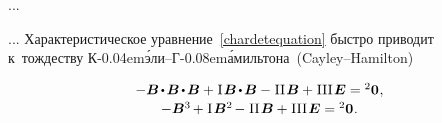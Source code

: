 \begin{otherlanguage}{russian}
...



... Характеристическое уравнение~\eqref{chardetequation} быстро приводит к~тождеству К\kern-0.04em\'{э}ли\hbox{--}Г\kern-0.08em\'{а}мильтона~(Cayley\hbox{--}Hamilton)

\nopagebreak\vspace{-0.2em}\begin{equation}\label{cayley-hamilton equation}
\begin{array}{c}
-\bm{B} \hspace{-0.2ex} \dotp \hspace{-0.2ex} \bm{B} \hspace{-0.2ex} \dotp \hspace{-0.2ex} \bm{B}
+ \hspace{.1ex} \mathrm{I} \hspace{.2ex} \bm{B} \hspace{-0.2ex} \dotp \hspace{-0.2ex} \bm{B}
- \hspace{.1ex} \mathrm{II} \hspace{.2ex} \bm{B}
+ \hspace{.1ex} \mathrm{III} \hspace{.2ex} \UnitDyad
= \zerobivalent
\hspace{.1ex} ,
\\[.16em]
-\bm{B}^{3} \hspace{-0.2ex}
+ \hspace{.1ex} \mathrm{I} \hspace{.2ex} \bm{B}^{2} \hspace{-0.2ex}
- \hspace{.1ex} \mathrm{II} \hspace{.2ex} \bm{B}
+ \hspace{.1ex} \mathrm{III} \hspace{.2ex} \UnitDyad
= \zerobivalent
\hspace{.1ex} .
\end{array}
\end{equation}

\end{otherlanguage}
